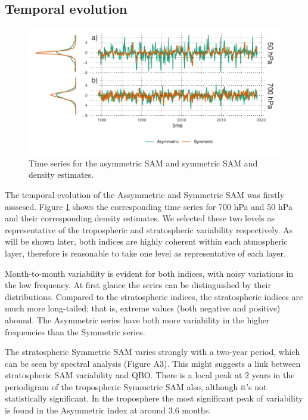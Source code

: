 \documentclass[twocol]{ametsocV5}
\begin{document}
\subsection{Temporal evolution}

\begin{figure}
\includegraphics{asymsam-timeseries-1} \caption[Time series for the asymmetric SAM and symmetric SAM and density estimates]{Time series for the asymmetric SAM and symmetric SAM and density estimates.}\label{fig:asymsam-timeseries}
\end{figure}

The temporal evolution of the Assymmetric and Symmetric SAM was firstly
asssesed. Figure \ref{fig:asymsam-timeseries} shows the corresponding
time series for 700 hPa and 50 hPa and their corresponding density
estimates. We selected these two levels as representative of the
tropospheric and stratospheric variability respectively. As will be
shown later, both indices are highly coherent within each atmospheric
layer, therefore is reasonable to take one level as representative of
each layer.

Month-to-month variability is evident for both indices, with noisy
variations in the low frequency. At first glance the series can be
distinguished by their distributions. Compared to the stratospheric
indices, the stratospheric indices are much more long-tailed; that is,
extreme values (both negative and positive) abound. The Asymmetric
series have both more variability in the higher frequencies than the
Symmetric series.

The stratospheric Symmetric SAM varies strongly with a two-year period,
which can be seen by spectral analysis (Figure A3). This might suggests
a link between stratospheric SAM variability and QBO. There is a local
peak at 2 years in the periodigram of the tropospheric Symmetric SAM
also, although it's not statistically significant. In the troposphere
the most significant peak of variability is found in the Asymmetric
index at around 3.6 months.
\end{document}
